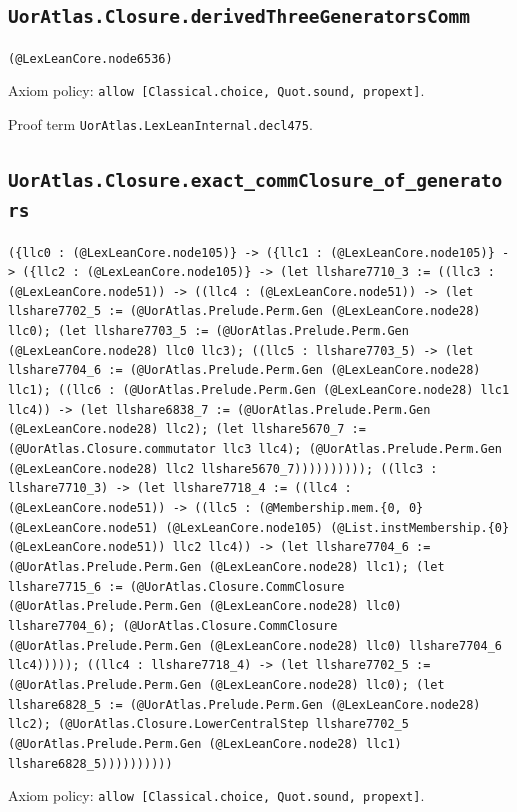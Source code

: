\documentclass[11pt]{article}
\begin{document}
\subsection*{\texttt{UorAtlas.Closure.derivedThreeGeneratorsComm}}
\noindent\texttt{(@LexLeanCore.node6536)}\par
\noindent Axiom policy: \texttt{allow [Classical.choice, Quot.sound, propext]}.\par
\noindent Proof term \texttt{UorAtlas.LexLeanInternal.decl475}.\par
\subsection*{\texttt{UorAtlas.Closure.exact\_commClosure\_of\_generators}}
\noindent\texttt{(\{llc0 : (@LexLeanCore.node105)\} -> (\{llc1 : (@LexLeanCore.node105)\} -> (\{llc2 : (@LexLeanCore.node105)\} -> (let llshare7710\_3 := ((llc3 : (@LexLeanCore.node51)) -> ((llc4 : (@LexLeanCore.node51)) -> (let llshare7702\_5 := (@UorAtlas.Prelude.Perm.Gen (@LexLeanCore.node28) llc0); (let llshare7703\_5 := (@UorAtlas.Prelude.Perm.Gen (@LexLeanCore.node28) llc0 llc3); ((llc5 : llshare7703\_5) -> (let llshare7704\_6 := (@UorAtlas.Prelude.Perm.Gen (@LexLeanCore.node28) llc1); ((llc6 : (@UorAtlas.Prelude.Perm.Gen (@LexLeanCore.node28) llc1 llc4)) -> (let llshare6838\_7 := (@UorAtlas.Prelude.Perm.Gen (@LexLeanCore.node28) llc2); (let llshare5670\_7 := (@UorAtlas.Closure.commutator llc3 llc4); (@UorAtlas.Prelude.Perm.Gen (@LexLeanCore.node28) llc2 llshare5670\_7)))))))))); ((llc3 : llshare7710\_3) -> (let llshare7718\_4 := ((llc4 : (@LexLeanCore.node51)) -> ((llc5 : (@Membership.mem.\{0, 0\} (@LexLeanCore.node51) (@LexLeanCore.node105) (@List.instMembership.\{0\} (@LexLeanCore.node51)) llc2 llc4)) -> (let llshare7704\_6 := (@UorAtlas.Prelude.Perm.Gen (@LexLeanCore.node28) llc1); (let llshare7715\_6 := (@UorAtlas.Closure.CommClosure (@UorAtlas.Prelude.Perm.Gen (@LexLeanCore.node28) llc0) llshare7704\_6); (@UorAtlas.Closure.CommClosure (@UorAtlas.Prelude.Perm.Gen (@LexLeanCore.node28) llc0) llshare7704\_6 llc4))))); ((llc4 : llshare7718\_4) -> (let llshare7702\_5 := (@UorAtlas.Prelude.Perm.Gen (@LexLeanCore.node28) llc0); (let llshare6828\_5 := (@UorAtlas.Prelude.Perm.Gen (@LexLeanCore.node28) llc2); (@UorAtlas.Closure.LowerCentralStep llshare7702\_5 (@UorAtlas.Prelude.Perm.Gen (@LexLeanCore.node28) llc1) llshare6828\_5))))))))))}\par
\noindent Axiom policy: \texttt{allow [Classical.choice, Quot.sound, propext]}.\par
\end{document}
